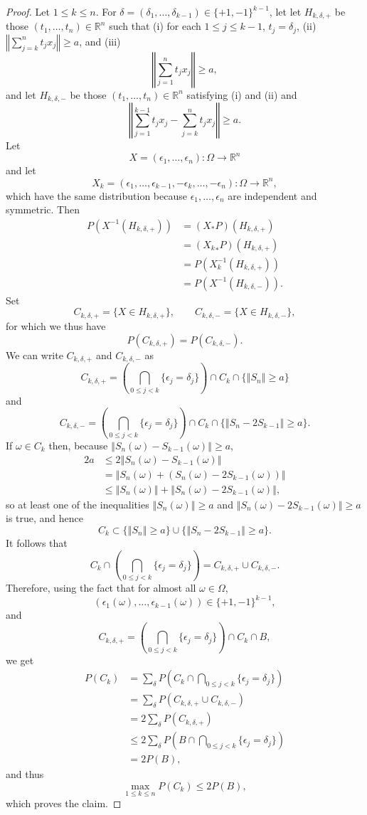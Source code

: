 \documentclass{article}
\newcommand{\norm}[1]{\left\Vert #1 \right\Vert}
\theoremstyle{definition}
\begin{document}
\begin{proof}
Let $1 \leq k \leq n$. For $\delta=(\delta_1,\ldots,\delta_{k-1}) \in \{+1,-1\}^{k-1}$, let
let $H_{k,\delta,+}$ be those
$(t_1,\ldots,t_n) \in \mathbb{R}^n$ such that (i) for each $1 \leq j \leq k-1$, $t_j=\delta_j$, (ii)
$\norm{\sum_{j=k}^n t_j x_j} \geq a$,
and (iii) 
\[
\norm{\sum_{j=1}^n t_j x_j} \geq a,
\]
and let $H_{k,\delta,-}$ be those $(t_1,\ldots,t_n) \in \mathbb{R}^n$ satisfying (i) and (ii) and 
\[
\norm{\sum_{j=1}^{k-1} t_j x_j - \sum_{j=k}^n t_j x_j} \geq a.
\]
Let
\[
X=(\epsilon_1,\ldots,\epsilon_n):\Omega \to \mathbb{R}^n
\] 
and let
\[
X_k=(\epsilon_1,\ldots,\epsilon_{k-1},-\epsilon_k,\ldots,-\epsilon_n):\Omega \to \mathbb{R}^n,
\]
which have the same distribution because $\epsilon_1,\ldots,\epsilon_n$ are independent and symmetric. 
Then
\begin{align*}
P(X^{-1}(H_{k,\delta,+}))&=(X_*P)(H_{k,\delta,+})\\
&=({X_k}_*P)(H_{k,\delta,+})\\
&=P(X_k^{-1}(H_{k,\delta,+}))\\
&=P(X^{-1}(H_{k,\delta,-})).
\end{align*}
Set
\[
C_{k,\delta,+} = \{X \in H_{k,\delta,+}\}, \qquad C_{k,\delta,-} = \{X \in H_{k,\delta,-}\},
\]
for which we thus have
\[
P(C_{k,\delta,+})=P(C_{k,\delta,-}).
\]
We can write $C_{k,\delta,+}$ and $C_{k,\delta,-}$ as
\[
C_{k,\delta,+} = \left( \bigcap_{0 \leq j < k} \{\epsilon_j=\delta_j\}\right) 
\cap C_k 
\cap \{\norm{S_n} \geq a\}
\]
and
\[
C_{k,\delta,-} = \left( \bigcap_{0 \leq j < k} \{\epsilon_j=\delta_j\}\right) 
\cap C_k 
\cap \{\norm{S_n-2S_{k-1}} \geq a\}.
\]
If $\omega \in C_k$ then, because $\norm{S_n(\omega)-S_{k-1}(\omega)} \geq a$, 
\begin{align*}
2a &\leq 2\norm{S_n(\omega)-S_{k-1}(\omega)}\\
&=\norm{S_n(\omega) + (S_n(\omega)-2S_{k-1}(\omega))}\\
&\leq \norm{S_n(\omega)}+\norm{S_n(\omega)-2S_{k-1}(\omega)},
\end{align*}
so at least one of the inequalities $\norm{S_n(\omega)} \geq a$ and $\norm{S_n(\omega)-2S_{k-1}(\omega)} \geq a$ is true, and hence
\[
C_k \subset \{\norm{S_n} \geq a\} \cup \{\norm{S_n-2S_{k-1}} \geq a\}.
\]
It follows that
\[
C_k \cap  \left( \bigcap_{0 \leq j < k} \{\epsilon_j=\delta_j\}\right)  = C_{k,\delta,+}
\cup C_{k,\delta,-}.
\]
Therefore,
using the fact that for almost all $\omega \in \Omega$,
\[
(\epsilon_1(\omega),\ldots,\epsilon_{k-1}(\omega)) \in \{+1,-1\}^{k-1},
\]
and
\[
C_{k,\delta,+} = \left(\bigcap_{0 \leq j < k} \{\epsilon_j=\delta_j\}\right)
\cap C_k \cap B,
\]
we get
\begin{align*}
P(C_k)&=\sum_\delta P\left(C_k \cap \bigcap_{0 \leq j < k} \{\epsilon_j=\delta_j\}\right)\\
&=\sum_\delta P(C_{k,\delta,+} \cup C_{k,\delta,-})\\
&=2\sum_\delta P(C_{k,\delta,+})\\
&\leq 2\sum_\delta P\left( B \cap \bigcap_{0 \leq j< k} \{\epsilon_j=\delta_j\}\right)\\
&=2P(B),
\end{align*}
and thus
\[
\max_{1 \leq k \leq n} P(C_k) \leq 2 P(B),
\]
which proves the claim.
\end{proof}
\end{document}
